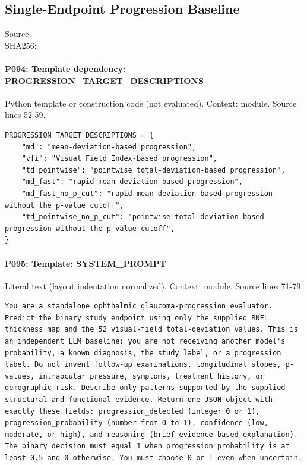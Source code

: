 \documentclass[10pt]{article}
\begin{document}
\subsection{Single-Endpoint Progression Baseline}
Source: \\
SHA256: {\scriptsize{}}
\paragraph{P094: Template dependency: PROGRESSION\_TARGET\_DESCRIPTIONS}
Python template or construction code (not evaluated). Context: module. Source lines 52-59.
\begin{Verbatim}
PROGRESSION_TARGET_DESCRIPTIONS = {
    "md": "mean-deviation-based progression",
    "vfi": "Visual Field Index-based progression",
    "td_pointwise": "pointwise total-deviation-based progression",
    "md_fast": "rapid mean-deviation-based progression",
    "md_fast_no_p_cut": "rapid mean-deviation-based progression without the p-value cutoff",
    "td_pointwise_no_p_cut": "pointwise total-deviation-based progression without the p-value cutoff",
}
\end{Verbatim}
\paragraph{P095: Template: SYSTEM\_PROMPT}
Literal text (layout indentation normalized). Context: module. Source lines 71-79.
\begin{Verbatim}
You are a standalone ophthalmic glaucoma-progression evaluator. Predict the binary study endpoint using only the supplied RNFL thickness map and the 52 visual-field total-deviation values. This is an independent LLM baseline: you are not receiving another model's probability, a known diagnosis, the study label, or a progression label. Do not invent follow-up examinations, longitudinal slopes, p-values, intraocular pressure, symptoms, treatment history, or demographic risk. Describe only patterns supported by the supplied structural and functional evidence. Return one JSON object with exactly these fields: progression_detected (integer 0 or 1), progression_probability (number from 0 to 1), confidence (low, moderate, or high), and reasoning (brief evidence-based explanation). The binary decision must equal 1 when progression_probability is at least 0.5 and 0 otherwise. You must choose 0 or 1 even when uncertain.
\end{Verbatim}
\end{document}
